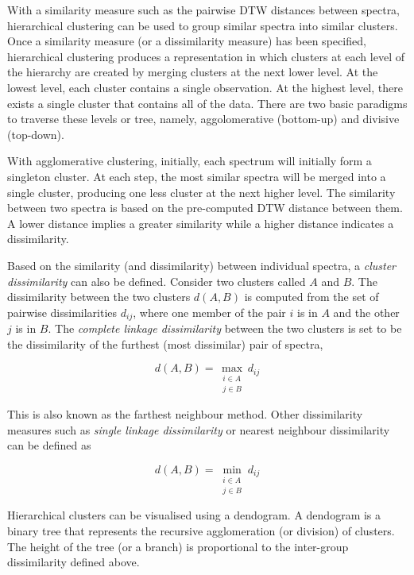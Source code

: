 With a similarity measure such as the pairwise DTW distances between spectra, hierarchical clustering can be used to group similar spectra into similar clusters. Once a similarity measure (or a dissimilarity measure) has been specified, hierarchical clustering produces a representation in which clusters at each level of the hierarchy are created by merging clusters at the next lower level. At the lowest level, each cluster contains a single observation. At the highest level, there exists a single cluster that contains all of the data\cite{hastie2009elements}. There are two basic paradigms to traverse these levels or tree, namely, aggolomerative (bottom-up) and divisive (top-down). 

With agglomerative clustering, initially, each spectrum will initially form a singleton cluster. At each step, the most similar spectra will be merged into a single cluster, producing one less cluster at the next higher level. The similarity between two spectra is based on the pre-computed DTW distance between them. A lower distance implies a greater similarity while a higher distance indicates a dissimilarity.  

Based on the similarity (and dissimilarity) between individual spectra, a \emph{cluster dissimilarity} can also be defined. Consider two clusters called $A$ and $B$. The dissimilarity between the two clusters $d(A,B)$ is computed from the set of pairwise dissimilarities $d_{ij}$, where one member of the pair $i$ is in $A$ and the other $j$ is in $B$. The \emph{complete linkage dissimilarity} between the two clusters is set to be the dissimilarity of the furthest (most dissimilar) pair of spectra,

\begin{equation}
    d(A,B) = \max_{\substack{i \in A \\ j \in B}} d_{ij}
\end{equation}

This is also known as the farthest neighbour method. Other dissimilarity measures such as \emph{single linkage dissimilarity} or nearest neighbour dissimilarity can be defined as

\begin{equation}
    d(A,B) = \min_{\substack{i \in A \\ j \in B}} d_{ij}
\end{equation}

Hierarchical clusters can be visualised using a dendogram. A dendogram is a binary tree that represents the recursive agglomeration (or division) of clusters. The height of the tree (or a branch) is proportional to the inter-group dissimilarity defined above. 

